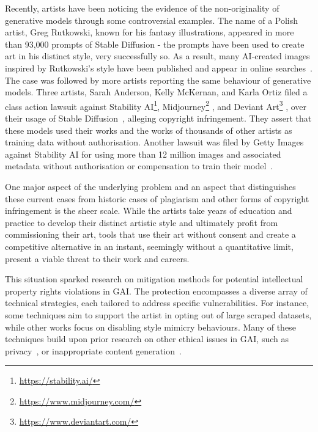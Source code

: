 \documentclass[conference,table]{IEEEtran} %
\begin{document}
Recently, artists have been noticing the evidence of the non-originality of generative models through some controversial examples. 
The name of a Polish artist, Greg Rutkowski, known for his fantasy illustrations, appeared in more than 93,000 prompts of Stable Diffusion - the prompts have been used to create art in his distinct style, very successfully so. 
As a result, many AI-created images inspired by Rutkowski's style have been published and appear in online searches~\cite{mit_technology_review_this_2022}. The case was followed by more artists reporting the same behaviour of generative models. 
Three artists, Sarah Anderson, Kelly McKernan, and Karla Ortiz filed a class action lawsuit against Stability AI\footnote{\url{https://stability.ai/}}, Midjourney\footnote{\url{https://www.midjourney.com/}}%
, and Deviant Art\footnote{\url{https://www.deviantart.com/}}%
, over their usage of Stable Diffusion~\cite{rombach_high-resolution_2022}, alleging copyright infringement. They assert that these models used their works and the works of thousands of other artists as training data without authorisation.
Another lawsuit was filed by Getty Images against Stability AI for using more than 12 million images and associated metadata without authorisation or compensation to train their model~\cite{nolan_ai_2023}.

One major aspect of the underlying problem and an aspect that distinguishes these current cases from historic cases of plagiarism and other forms of copyright infringement is the sheer scale.
While the artists take years of education and practice to develop their distinct artistic style and ultimately profit from commissioning their art, tools that use their art without consent and create a competitive alternative in an instant, seemingly without a quantitative limit, present a viable threat to their work and careers.

This situation sparked research on mitigation methods for potential intellectual property rights violations in GAI. 
The protection encompasses a diverse array of technical strategies, each tailored to address specific vulnerabilities.
For instance, some techniques aim to support the artist in opting out of large scraped datasets, while other works focus on disabling style mimicry behaviours. 
Many of these techniques build upon prior research on other ethical issues in GAI, such as privacy~\cite{matsumoto_membership_2023}, or inappropriate content generation~\cite{gandikota_erasing_2023}.
\end{document}
